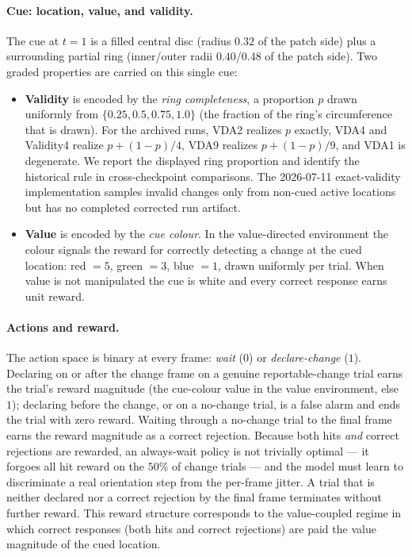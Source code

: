 \paragraph{Cue: location, value, and validity.}
The cue at $t = 1$ is a filled central disc (radius $0.32$ of the patch
side) plus a surrounding partial ring (inner/outer radii $0.40$/$0.48$ of
the patch side). Two graded properties are carried on this single cue:
\begin{itemize}
\item \textbf{Validity} is encoded by the \emph{ring completeness}, a
  proportion $p$ drawn uniformly from $\{0.25, 0.5, 0.75, 1.0\}$ (the
  fraction of the ring's circumference that is drawn). For the archived runs,
  VDA2 realizes $p$ exactly, VDA4 and Validity4 realize $p+(1-p)/4$, VDA9
  realizes $p+(1-p)/9$, and VDA1 is degenerate. We report the displayed ring
  proportion and identify the historical rule in cross-checkpoint comparisons.
  The 2026-07-11 exact-validity implementation samples invalid changes only from
  non-cued active locations but has no completed corrected run artifact.
\item \textbf{Value} is encoded by the \emph{cue colour}. In the
  value-directed environment the colour signals the reward for correctly
  detecting a change at the cued location: red $= 5$, green $= 3$,
  blue $= 1$, drawn uniformly per trial. When value is not manipulated the
  cue is white and every correct response earns unit reward.
\end{itemize}

\paragraph{Actions and reward.}
The action space is binary at every frame: \emph{wait} ($0$) or
\emph{declare-change} ($1$). Declaring on or after the change frame on a
genuine reportable-change trial earns the trial's reward magnitude (the
cue-colour value in the value environment, else $1$); declaring before the
change, or on a no-change trial, is a false alarm and ends the trial with
zero reward. Waiting through a no-change trial to the final frame earns the
reward magnitude as a correct rejection. Because both hits \emph{and}
correct rejections are rewarded, an always-wait policy is not trivially
optimal --- it forgoes all hit reward on the $50\%$ of change trials --- and
the model must learn to discriminate a real orientation step from the
per-frame jitter. A trial that is neither declared nor a correct rejection
by the final frame terminates without further reward. This reward
structure corresponds to the value-coupled regime in which correct
responses (both hits and correct rejections) are paid the value magnitude
of the cued location.

